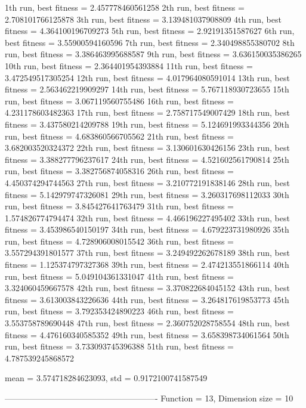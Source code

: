 1th run, best fitness = 2.457778460561258
2th run, best fitness = 2.708101766125878
3th run, best fitness = 3.139481037908809
4th run, best fitness = 4.364100196709273
5th run, best fitness = 2.92191351587627
6th run, best fitness = 3.55900594160596
7th run, best fitness = 2.340498855380702
8th run, best fitness = 3.386463995688587
9th run, best fitness = 3.636150035386265
10th run, best fitness = 2.364401954393884
11th run, best fitness = 3.472549517305254
12th run, best fitness = 4.017964080591014
13th run, best fitness = 2.563462219909297
14th run, best fitness = 5.767118930723655
15th run, best fitness = 3.067119560755486
16th run, best fitness = 4.231178603482363
17th run, best fitness = 2.758717549007429
18th run, best fitness = 3.437580214209788
19th run, best fitness = 5.124691993344356
20th run, best fitness = 4.683860566705562
21th run, best fitness = 3.682003520324372
22th run, best fitness = 3.130601630426156
23th run, best fitness = 3.388277796237617
24th run, best fitness = 4.521602561790814
25th run, best fitness = 3.382756874058316
26th run, best fitness = 4.450374294744563
27th run, best fitness = 3.210772191838146
28th run, best fitness = 5.142979747326081
29th run, best fitness = 3.260317698112033
30th run, best fitness = 3.845427641763479
31th run, best fitness = 1.574826774794474
32th run, best fitness = 4.466196227495402
33th run, best fitness = 3.453986540150197
34th run, best fitness = 4.679223731980926
35th run, best fitness = 4.728906008015542
36th run, best fitness = 3.557294391801577
37th run, best fitness = 3.249492262678189
38th run, best fitness = 1.125374797327368
39th run, best fitness = 2.474213551866114
40th run, best fitness = 5.049104361331047
41th run, best fitness = 3.324060459667578
42th run, best fitness = 3.370822684045152
43th run, best fitness = 3.613003843226636
44th run, best fitness = 3.264817619853773
45th run, best fitness = 3.792353424890223
46th run, best fitness = 3.553758789690448
47th run, best fitness = 2.360752028758554
48th run, best fitness = 4.476160340585352
49th run, best fitness = 3.658398734061564
50th run, best fitness = 3.733093745396388
51th run, best fitness = 4.787539245868572

mean = 3.574718284623093, std = 0.9172100741587549

-------------------------------------------------------
Function = 13, Dimension size = 10

